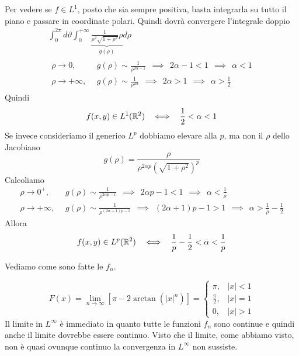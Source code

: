 Per vedere se $f\in L^{1}$, posto che sia sempre positiva, basta integrarla su tutto il piano e passare in coordinate polari. Quindi dovrà convergere l'integrale doppio
\begin{gather*}
\int^{2\pi}_{0} d\vartheta \int^{+ \infty}_{0}\underbrace{\frac{1}{\rho^{2}\sqrt{1 + \rho^{2}}} \rho}_{g(\rho)} d\rho \\
\begin{aligned}
\rho \rightarrow 0, & \ \ g(\rho)\sim \frac{1}{\rho^{2\alpha - 1}} \ \ \implies \ \ 2\alpha - 1 < 1\ \ \implies \ \ \alpha < 1\\
\rho \rightarrow + \infty, & \ \ g(\rho)\sim \frac{1}{\rho^{2\alpha}} \ \ \implies \ \ 2\alpha > 1\ \ \implies \ \ \alpha > \frac{1}{2}
\end{aligned}
\end{gather*}
Quindi
\begin{equation*}
f(x, y)\in L^{1} (\RR^{2})\ \ \iff \ \ \frac{1}{2} < \alpha < 1
\end{equation*}
Se invece consideriamo il generico $L^{p}$ dobbiamo elevare alla $p$, ma non il $\rho $ dello Jacobiano
\begin{equation*}
g(\rho) = \frac{\rho}{\rho^{2\alpha p}\left(\sqrt{1 + \rho^{2}}\right)^{p}}
\end{equation*}
Calcoliamo
\begin{equation*}
\begin{aligned}
\rho \rightarrow 0^{+}, & \ \ g(\rho)\sim \frac{1}{\rho^{2\alpha p - 1}} \ \ \implies \ \ 2\alpha p - 1 < 1\ \ \implies \ \ \alpha < \frac{1}{\rho}\\
\rho \rightarrow + \infty, & \ \ g(\rho)\sim \frac{1}{\rho^{(2\alpha + 1)p - 1}} \ \ \implies \ \ (2\alpha + 1)p - 1 > 1\ \ \implies \ \ \alpha > \frac{1}{\rho} - \frac{1}{2}
\end{aligned}
\end{equation*}
Allora
\begin{equation*}
f(x, y)\in L^{p} (\RR^{2})\ \ \iff \ \ \frac{1}{p} - \frac{1}{2} < \alpha < \frac{1}{p}
\end{equation*}
\Soluzione

Vediamo come sono fatte le $f_{n}$.

\begin{equation*}
F(x) = \lim_{n\rightarrow \infty}\left[ \pi - 2\arctan (|x|^{n})\right] =
\begin{cases}
\pi, & |x| < 1\\
\frac{\pi}{2}, & |x| = 1\\
0, & |x| > 1
\end{cases}
\end{equation*}
Il limite in $L^{\infty}$ è immediato in quanto tutte le funzioni $f_{n}$ sono continue e quindi anche il limite dovrebbe essere continuo. Visto che il limite, come abbiamo visto, non è quasi ovunque continuo la convergenza in $L^{\infty}$ non sussiste.

